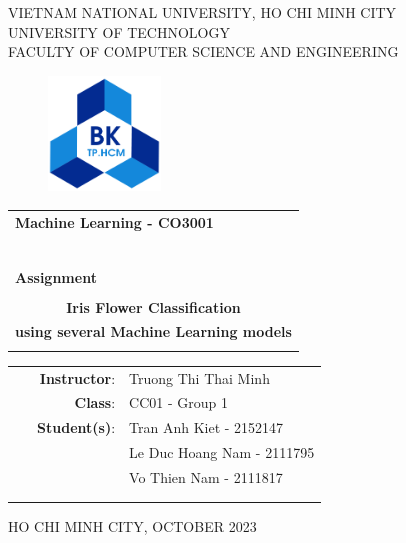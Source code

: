\documentclass[a4paper]{article}
\begin{document}
\begin{titlepage}
\begin{center}
VIETNAM NATIONAL UNIVERSITY, HO CHI MINH CITY \\
UNIVERSITY OF TECHNOLOGY \\
FACULTY OF COMPUTER SCIENCE AND ENGINEERING
\end{center}

\vspace{1cm}

\begin{figure}[h!]
\begin{center}
\includegraphics[width=3cm]{hcmut.png}
\end{center}
\end{figure}

\vspace{1cm}


\begin{center}
\begin{tabular}{c}
\multicolumn{1}{l}{\textbf{{\Large Machine Learning - CO3001}}}\\
~~\\
\hline
\\
\multicolumn{1}{l}{\textbf{{\Large Assignment}}}\\
\\
\textbf{{\Huge Iris Flower Classification}}\\
\textbf{{\Huge using several Machine Learning models}}\\
\\
\hline
\end{tabular}
\end{center}

\vspace{3cm}

\begin{table}[h]
\begin{tabular}{rrl}
\hspace{3 cm} & \textbf{{\ Instructor}}: & Truong Thi Thai Minh \\
\hspace{3 cm} & \textbf{{\ Class}}: & CC01 - Group 1 \\
\hspace{3 cm} & \textbf{{\ Student(s)}}: 
& Tran Anh Kiet - 2152147 \\ 
& &  Le Duc Hoang Nam - 2111795\\
& &  Vo Thien Nam - 2111817\\

& &   \\
& &   \\
\end{tabular}
\end{table}

\begin{center}
{\footnotesize HO CHI MINH CITY, OCTOBER 2023}
\end{center}
\end{titlepage}
\end{document}
